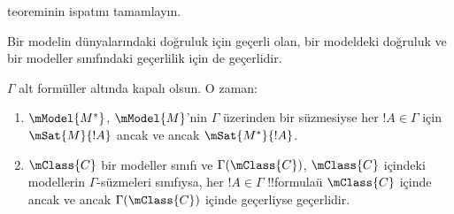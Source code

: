 \documentclass[../../../include/open-logic-section]{subfiles}
\begin{document}
\begin{prob}
   teoreminin ispatını tamamlayın.
\end{prob}

Bir modelin dünyalarındaki doğruluk için geçerli olan, bir modeldeki
doğruluk ve bir modeller sınıfındaki geçerlilik için de geçerlidir.

\begin{cor}
  $\Gamma$ alt formüller altında kapalı olsun. O zaman:
  \begin{enumerate}
  \item $\mModel{M^*}$, $\mModel{M}$'nin $\Gamma$ üzerinden bir süzmesiyse
    her $!A\in\Gamma$ için $\mSat{M}{!A}$ ancak ve ancak
    $\mSat{M^*}{!A}$.
  \item $\mClass{C}$ bir modeller sınıfı ve $\Gamma(\mClass{C})$,
    $\mClass{C}$ içindeki modellerin $\Gamma$-süzmeleri sınıfıysa, her
    $!A\in\Gamma$ !!{formula}{}ü $\mClass{C}$ içinde ancak ve ancak
    $\Gamma(\mClass{C})$ içinde geçerliyse geçerlidir.
  \end{enumerate}
\end{cor}
\end{document}
